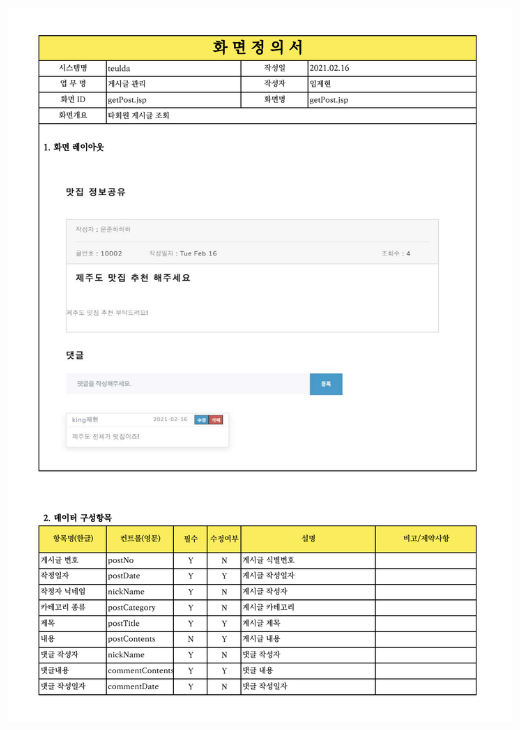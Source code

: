 {{{{{{{{{{{{{{{{{{{{{{{{{{{{{{{{{{{{{{{{{{{{{{{{{{{{{{{{{{{{{{{\includegraphics[width=19cm]{./Figure/Design/Display/post/post_11.pdf} \\
}}}}}}}}}}}}}}}}}}}}}}}}}}}}}}}}}}}}}}}}}}}}}}}}}}}}}}}}}}}}}}}
